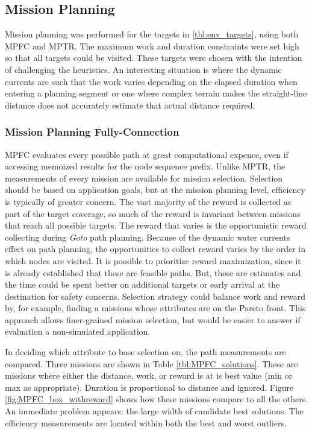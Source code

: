 \documentclass{tamuccthesis}
\begin{document}
\subsection{Mission Planning}

Mission planning was performed for the targets in \ref{tbl:env_targets}, using both MPFC and MPTR. The maximum work and duration constraints were set high so that all targets could be visited. These targets were chosen with the intention of challenging the heuristics. An interesting situation is where the dynamic currents are such that the work varies depending on the elapsed duration when entering a planning segment or one where complex terrain makes the straight-line distance does not accurately estimate that actual distance required. 

\subsubsection{Mission Planning Fully-Connection}

MPFC evaluates every possible path at great computational expence, even if accessing memoized results for the node sequence prefix. Unlike MPTR, the measurements of every mission are available for mission selection. Selection should be based on application goals, but at the mission planning level, efficiency is typically of greater concern. The vast majority of the reward is collected as part of the target coverage, so much of the reward is invariant between missions that reach all possible targets. The reward that varies is the opportunistic reward collecting during \textit{Goto} path planning. Because of the dynamic water currents effect on path planning, the opportunities to collect reward varies by the order in which nodes are visited. It is possible to prioritize reward maximization, since it is already established that these are feasible paths. But, these are estimates and the time could be spent better on additional targets or early arrival at the destination for safety concerns. Selection strategy could balance work and reward by, for example, finding a missions whose attributes are on the Pareto front. This approach allows finer-grained mission selection, but would be easier to answer if evaluation a non-simulated application. 

In deciding which attribute to base selection on, the path measurements are compared. Three missions are shown in Table \ref{tbl:MPFC_solutions}. These are missions where either the distance, work, or reward is at is best value (min or max as appropriate). Duration is proportional to distance and ignored. Figure \ref{fig:MPFC_box_withreward} shows how these missions compare to all the others. An immediate problem appears: the large width of candidate best solutions. The efficiency measurements are located within both the best and worst outliers. 
\end{document}
